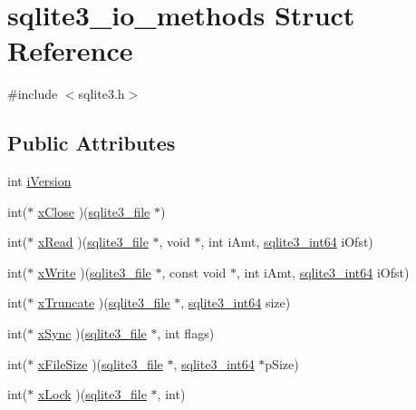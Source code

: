 \hypertarget{structsqlite3__io__methods}{\section{sqlite3\-\_\-io\-\_\-methods Struct Reference}
\label{structsqlite3__io__methods}
}


{\ttfamily \#include $<$sqlite3.\-h$>$}

\subsection*{Public Attributes}
\begin{DoxyCompactItemize}
\item 
int \hyperlink{structsqlite3__io__methods_ad1c72bdfde750a09a797f314a096a965}{i\-Version}
\item 
int($\ast$ \hyperlink{structsqlite3__io__methods_a3c021d16959e0533f507b3212681a22e}{x\-Close} )(\hyperlink{structsqlite3__file}{sqlite3\-\_\-file} $\ast$)
\item 
int($\ast$ \hyperlink{structsqlite3__io__methods_a19870694752f65e8738d89d871d0ca7f}{x\-Read} )(\hyperlink{structsqlite3__file}{sqlite3\-\_\-file} $\ast$, void $\ast$, int i\-Amt, \hyperlink{sqlite3_8c_a0a4d3e6c1ad46f90e746b920ab6ca0d2}{sqlite3\-\_\-int64} i\-Ofst)
\item 
int($\ast$ \hyperlink{structsqlite3__io__methods_a803b39bc86bbff522602597fa4390e0f}{x\-Write} )(\hyperlink{structsqlite3__file}{sqlite3\-\_\-file} $\ast$, const void $\ast$, int i\-Amt, \hyperlink{sqlite3_8c_a0a4d3e6c1ad46f90e746b920ab6ca0d2}{sqlite3\-\_\-int64} i\-Ofst)
\item 
int($\ast$ \hyperlink{structsqlite3__io__methods_a981cc60fc305bfb38eecd7123a513a20}{x\-Truncate} )(\hyperlink{structsqlite3__file}{sqlite3\-\_\-file} $\ast$, \hyperlink{sqlite3_8c_a0a4d3e6c1ad46f90e746b920ab6ca0d2}{sqlite3\-\_\-int64} size)
\item 
int($\ast$ \hyperlink{structsqlite3__io__methods_a8d39ac02aeb1eb63622008217031b098}{x\-Sync} )(\hyperlink{structsqlite3__file}{sqlite3\-\_\-file} $\ast$, int flags)
\item 
int($\ast$ \hyperlink{structsqlite3__io__methods_ad269e3cbda39d0a2383aef13b60b02f8}{x\-File\-Size} )(\hyperlink{structsqlite3__file}{sqlite3\-\_\-file} $\ast$, \hyperlink{sqlite3_8c_a0a4d3e6c1ad46f90e746b920ab6ca0d2}{sqlite3\-\_\-int64} $\ast$p\-Size)
\item 
int($\ast$ \hyperlink{structsqlite3__io__methods_a3e4749687788b89ed0f672db7a4f6ac8}{x\-Lock} )(\hyperlink{structsqlite3__file}{sqlite3\-\_\-file} $\ast$, int)

\end{DoxyCompactItemize}
